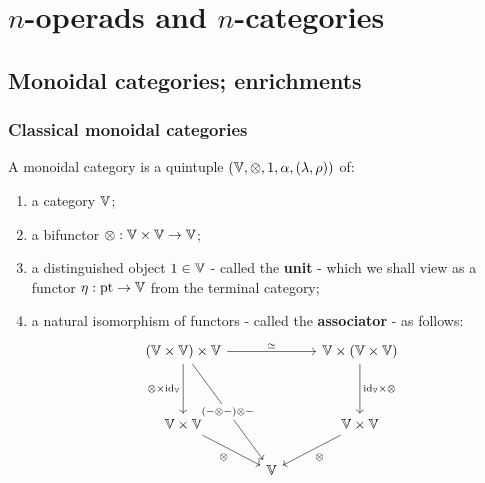     \section{\texorpdfstring{$n$}{}-operads and \texorpdfstring{$n$}{}-categories}
        \subsection{Monoidal categories; enrichments}
            \subsubsection{Classical monoidal categories}
                \begin{definition} \label{def: monoidal_categories} 
                    A monoidal category is a quintuple $(\V, \tensor, 1, \alpha, (\lambda, \rho))$ of:
                        \begin{enumerate}
                            \item a category $\V$;
                            \item a bifunctor $\tensor: \V \x \V \to \V$;
                            \item a distinguished object $1 \in \V$ - called the \textbf{unit} - which we shall view as a functor $\eta: \pt \to \V$ from the terminal category;
                            \item a natural isomorphism of functors - called the \textbf{associator} - as follows:
                                $$
                                    \begin{tikzcd}
                                    	{(\V \x \V) \x \V} && {\V \x (\V \x \V)} \\
                                    	\\
                                    	{\V \x \V} && {\V \x \V} \\
                                    	& \V
                                    	\arrow["{\tensor \x \id_{\V}}"', from=1-1, to=3-1]
                                    	\arrow["\tensor"', from=3-1, to=4-2]
                                    	\arrow["\tensor", from=3-3, to=4-2]
                                    	\arrow["{\id_{\V} \x \tensor }", from=1-3, to=3-3]
                                    	\arrow["\cong", from=1-1, to=1-3]
                                    	\arrow[""{name=0, anchor=center, inner sep=0}, "{(- \tensor -) \tensor -}"{description}, from=1-1, to=4-2]

\end{tikzcd}$$
\end{enumerate}
\end{definition}
